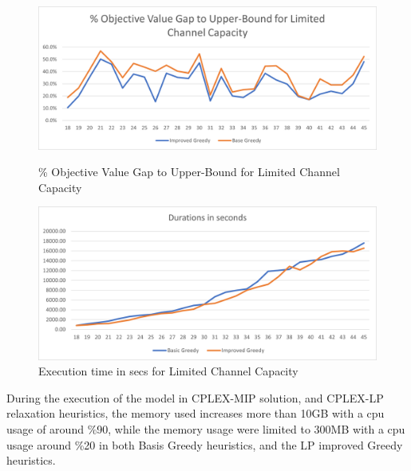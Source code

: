 \documentclass[11pt]{article}
\begin{document}
        \begin{figure}[htb!]
        \centering
        \begin{minipage}{.6\textwidth}
            \centering
            \includegraphics[width=.7\linewidth]{performance_ub_limited_18_45.png}
            \caption{\% Objective Value Gap to Upper-Bound for Limited Channel Capacity}
            \label{fig:fig_value_gap_ub_limited_18_45}
        \end{minipage}%
        \begin{minipage}{.6\textwidth}
            \centering
            \includegraphics[width=.7\linewidth]{durations_ub_limited_18_45.png}
            \caption{Execution time in secs for Limited Channel Capacity}
            \label{fig:fig_durations_ub_limited_18_45}
        \end{minipage}
        \end{figure}

        
\newpage

During the execution of the model in CPLEX-MIP solution, and CPLEX-LP relaxation heuristics, the memory used increases more than 10GB with a cpu usage of around \%90, while the memory usage were limited to 300MB with a cpu usage around \%20 in both Basis Greedy heuristics, and the LP improved Greedy heuristics.\\
\end{document}
